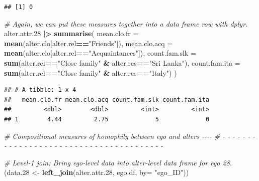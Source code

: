 \documentclass[
]{book}
\newenvironment{Shaded}{\begin{snugshade}}{\end{snugshade}}
\newcommand{\AttributeTok}[1]{\textcolor[rgb]{0.13,0.29,0.53}{#1}}
\newcommand{\CommentTok}[1]{\textcolor[rgb]{0.56,0.35,0.01}{\textit{#1}}}
\newcommand{\FloatTok}[1]{\textcolor[rgb]{0.00,0.00,0.81}{#1}}
\newcommand{\FunctionTok}[1]{\textcolor[rgb]{0.13,0.29,0.53}{\textbf{#1}}}
\newcommand{\NormalTok}[1]{#1}
\newcommand{\OtherTok}[1]{\textcolor[rgb]{0.56,0.35,0.01}{#1}}
\newcommand{\SpecialCharTok}[1]{\textcolor[rgb]{0.81,0.36,0.00}{\textbf{#1}}}
\newcommand{\StringTok}[1]{\textcolor[rgb]{0.31,0.60,0.02}{#1}}
\begin{document}
\begin{Shaded}
\end{Shaded}

\begin{verbatim}
## [1] 0
\end{verbatim}

\begin{Shaded}
\begin{Highlighting}[]
\CommentTok{\# Again, we can put these measures together into a data frame row with dplyr.}
\NormalTok{alter.attr}\FloatTok{.28} \SpecialCharTok{|\textgreater{}}
  \FunctionTok{summarise}\NormalTok{(}
    \AttributeTok{mean.clo.fr =} \FunctionTok{mean}\NormalTok{(alter.clo[alter.rel}\SpecialCharTok{==}\StringTok{"Friends"}\NormalTok{]), }
    \AttributeTok{mean.clo.acq =} \FunctionTok{mean}\NormalTok{(alter.clo[alter.rel}\SpecialCharTok{==}\StringTok{"Acquaintances"}\NormalTok{]),}
    \AttributeTok{count.fam.slk =} \FunctionTok{sum}\NormalTok{(alter.rel}\SpecialCharTok{==}\StringTok{"Close family"} \SpecialCharTok{\&}\NormalTok{ alter.res}\SpecialCharTok{==}\StringTok{"Sri Lanka"}\NormalTok{),}
    \AttributeTok{count.fam.ita =} \FunctionTok{sum}\NormalTok{(alter.rel}\SpecialCharTok{==}\StringTok{"Close family"} \SpecialCharTok{\&}\NormalTok{ alter.res}\SpecialCharTok{==}\StringTok{"Italy"}\NormalTok{)}
\NormalTok{  )}
\end{Highlighting}
\end{Shaded}

\begin{verbatim}
## # A tibble: 1 x 4
##   mean.clo.fr mean.clo.acq count.fam.slk count.fam.ita
##         <dbl>        <dbl>         <int>         <int>
## 1        4.44         2.75             5             0
\end{verbatim}

\begin{Shaded}
\begin{Highlighting}[]
\CommentTok{\# Compositional measures of homophily between ego and alters                {-}{-}{-}{-}}
\CommentTok{\# {-} {-} {-} {-} {-} {-} {-} {-} {-} {-} {-} {-} {-} {-} {-} {-} {-} {-} {-} {-} {-} {-} {-} {-} {-} {-} {-} {-} {-} {-} {-} {-} {-} {-} {-} {-} {-} {-} {-} }

\CommentTok{\# Level{-}1 join: Bring ego{-}level data into alter{-}level data frame for ego 28.}
\NormalTok{(data}\FloatTok{.28} \OtherTok{\textless{}{-}} \FunctionTok{left\_join}\NormalTok{(alter.attr}\FloatTok{.28}\NormalTok{, ego.df, }\AttributeTok{by=} \StringTok{"ego\_ID"}\NormalTok{))}
\end{Highlighting}
\end{Shaded}
\end{document}
